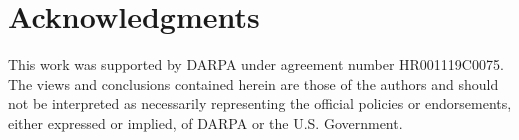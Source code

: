 \documentclass[letterpaper]{article}
\begin{document}
\section*{Acknowledgments}
This work was supported by DARPA under agreement number HR001119C0075.
The views and conclusions contained herein are those of the authors
and should not be interpreted as necessarily representing the official
policies or endorsements, either expressed or implied, of DARPA or the
U.S. Government.



\end{document}

